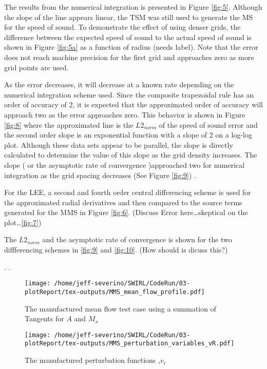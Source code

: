 \documentclass[a4paper]{article}
\begin{document}
The results from the numerical integration is presented in Figure \ref{fig:5}. Although 
the slope of the line appears linear, the TSM was still used to generate the 
MS for the speed of sound. To demonstrate the effect of using denser grids, the 
difference between the expected speed of sound to the actual speed of sound is 
shown in Figure \ref{fig:5a} as a function of radius (needs label). 
Note that the error does not reach machine precision for the first grid and 
approaches zero as more grid points are used. 

As the error decreases, it will decrease at a known rate depending on the numerical
integration scheme used. Since the composite trapezoidal rule has an order of accuracy of 2, 
it is expected that the approximated order of accuracy will approach two as
the error approaches zero. This behavior is shown in Figure \ref{fig:8} where the approximated
line is the $L2_{norm}$ of the speed of sound error and the second order slope
is an exponential function with a slope of 2 on a log-log plot. Although these
data sets appear to be parallel, the slope is directly calculated to determine
the value of this slope as the grid density increases. The slope ( or the asymptotic rate 
of convergence )approached two for numerical integration as the grid spacing decreases (See Figure \ref{fig:9}) .

For the LEE, a second and fourth order central differencing scheme is used
for the approximated radial derivatives and then compared to the source terms 
generated for the MMS in Figure \ref{fig:6}. (Discuss Error here\dots skeptical 
on the plot\dots \ref{fig:7})

The $L2_{norm}$ and the  asymptotic rate of convergence is shown for the 
two diffferencing schemes in  \ref{fig:9} and \ref{fig:10}. (How should is dicuss this?) 









.
.  






\begin{figure}[!]
    \centering
    \texttt{[image: /home/jeff-severino/SWIRL/CodeRun/03-plotReport/tex-outputs/MMS\_mean\_flow\_profile.pdf]}
    \caption{The manufactured mean flow test case using a summation of Tangents for $A$ and $M_x$}
    \label{fig:1}
\end{figure}


\begin{figure}[!]
    \centering
    \texttt{[image: /home/jeff-severino/SWIRL/CodeRun/03-plotReport/tex-outputs/MMS\_perturbation\_variables\_vR.pdf]}
\caption{The manufactured perturbation functions ,$v_r$}%
    \label{fig:1a}
\end{figure}
\end{document}
